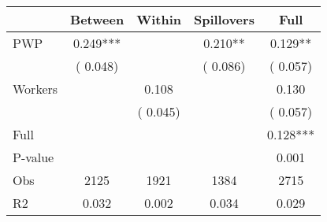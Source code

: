 
\begin{tabular}{l*{4}{c}}\hline&\multicolumn{1}{c}{Between}&\multicolumn{1}{c}{Within}&\multicolumn{1}{c}{Spillovers}&\multicolumn{1}{c}{Full}\\ \hline
 PWP           &              0.249***      &                                               &        0.210** &         0.129**                            \\ 
                               &        (       0.048)           &                                       &       (       0.086)     &      (       0.057)                                           \\ 
 Workers       &                                               &        0.108    &                                &             0.130                            \\ 
                               &                                               & (       0.045)                  &                                        &      (       0.057)                                           \\ 
\hline                                                                                                                                                                                                                                            
 Full                  &                                               &                                               &                                        &             0.128***                                     \\ 
 P-value               &                                               &                                               &                                        &             0.001                                           \\ 
 Obs                   &               2125               &       1921                       &       1384                &              2715                                               \\ 
 R2                    &                      0.032              &              0.002                      &              0.034               &                     0.029                                              \\ 
\hline \end{tabular}                                                                                                                                                                                                              